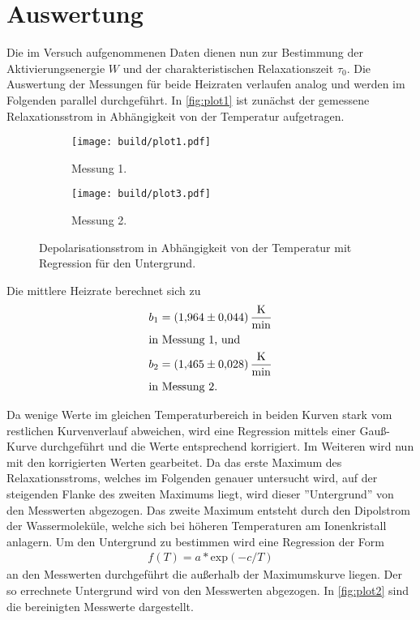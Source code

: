 \section{Auswertung}
\label{sec:Auswertung}

Die im Versuch aufgenommenen Daten dienen nun zur Bestimmung der Aktivierungsenergie $W$ und der charakteristischen Relaxationszeit $\tau_0$.
Die Auswertung der Messungen für beide Heizraten verlaufen analog und werden im Folgenden parallel durchgeführt.
In \autoref{fig:plot1} ist zunächst der gemessene Relaxationsstrom in Abhängigkeit von der Temperatur aufgetragen.

\begin{figure}[H]
  \begin{subfigure}{\textwidth}
  \centering
  \texttt{[image: build/plot1.pdf]}
  \caption{Messung 1.}
  \label{fig:plot1a}
  \end{subfigure}
  \hfill
  \begin{subfigure}{\textwidth}
  \centering
  \texttt{[image: build/plot3.pdf]}
  \caption{Messung 2.}
  \label{fig:plot1b}
  \end{subfigure}
  \caption{Depolarisationsstrom in Abhängigkeit von der Temperatur mit Regression für den Untergrund.}
  \label{fig:plot1}
\end{figure}

Die mittlere Heizrate berechnet sich zu
\begin{align*}
  b_1&= \qty{1.964 \pm 0.044}{\kelvin\per\minute}\\
\intertext{in Messung 1, und}
  b_2 &= \qty{1.465 \pm 0.028}{\kelvin\per\minute}\\
\intertext{in Messung 2.}
\end{align*}

Da wenige Werte im gleichen Temperaturbereich in beiden Kurven stark vom restlichen Kurvenverlauf abweichen, wird eine Regression mittels
einer Gauß-Kurve durchgeführt und die Werte entsprechend korrigiert. Im Weiteren wird nun mit den korrigierten Werten gearbeitet.
Da das erste Maximum des Relaxationsstroms, welches im Folgenden genauer
untersucht wird, auf der steigenden Flanke des zweiten Maximums liegt, wird dieser
”Untergrund” von den Messwerten abgezogen.
Das zweite Maximum entsteht durch den Dipolstrom der Wassermoleküle, welche sich bei höheren Temperaturen am Ionenkristall anlagern.
Um den Untergrund zu bestimmen wird eine Regression der Form
\begin{align*}
  f(T)= a * \text{exp}(-c/T)
\end{align*}
an den Messwerten durchgeführt die außerhalb der Maximumskurve liegen.
Der so errechnete Untergrund wird von den Messwerten abgezogen.
In \autoref{fig:plot2} sind die bereinigten Messwerte dargestellt.

